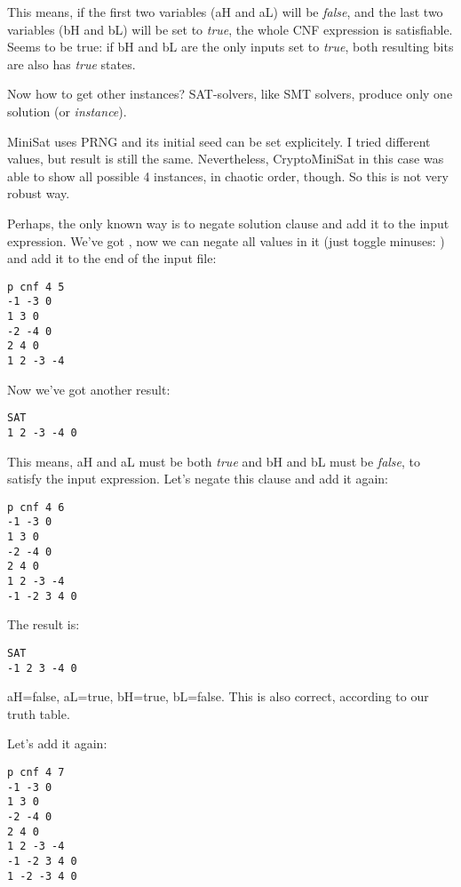 This means, if the first two variables (aH and aL) will be \textit{false}, and the last two variables (bH and bL) will be set to \textit{true},
the whole \ac{CNF} expression is satisfiable.
Seems to be true: if bH and bL are the only inputs set to \textit{true}, both resulting bits are also has \textit{true} states.

Now how to get other instances? \ac{SAT}-solvers, like \ac{SMT} solvers, produce only one solution (or \textit{instance}).

MiniSat uses \ac{PRNG} and its initial seed can be set explicitely. I tried different values, but result is still the same.
Nevertheless, CryptoMiniSat in this case was able to show all possible 4 instances, in chaotic order, though.
So this is not very robust way.

Perhaps, the only known way is to negate solution clause and add it to the input expression.
We've got , 
now we can negate all values in it (just toggle minuses: ) and add it to the end of the input file:

\begin{lstlisting}
p cnf 4 5
-1 -3 0
1 3 0
-2 -4 0
2 4 0
1 2 -3 -4
\end{lstlisting}

Now we've got another result:

\begin{lstlisting}
SAT
1 2 -3 -4 0
\end{lstlisting}

This means, aH and aL must be both \textit{true} and bH and bL must be \textit{false}, to satisfy the input expression.
Let's negate this clause and add it again:

\begin{lstlisting}
p cnf 4 6
-1 -3 0
1 3 0
-2 -4 0
2 4 0
1 2 -3 -4
-1 -2 3 4 0
\end{lstlisting}

The result is:

\begin{lstlisting}
SAT
-1 2 3 -4 0
\end{lstlisting}

aH=false, aL=true, bH=true, bL=false. This is also correct, according to our truth table.

Let's add it again:

\begin{lstlisting}
p cnf 4 7
-1 -3 0
1 3 0
-2 -4 0
2 4 0
1 2 -3 -4
-1 -2 3 4 0
1 -2 -3 4 0
\end{lstlisting}

